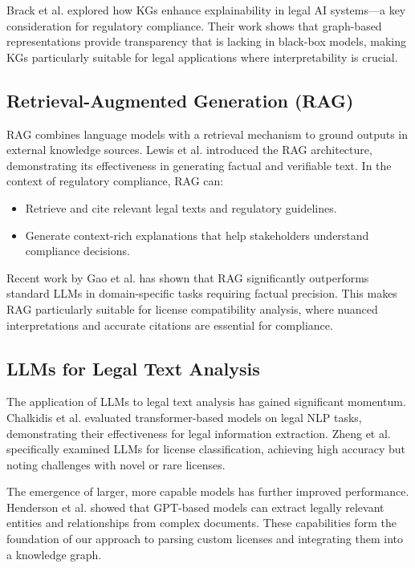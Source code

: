 \documentclass[12pt]{article}
\begin{document}
Brack et al. \cite{brack2021knowledge} explored how KGs enhance explainability in legal AI systems—a key consideration for regulatory compliance. Their work shows that graph-based representations provide transparency that is lacking in black-box models, making KGs particularly suitable for legal applications where interpretability is crucial.

\subsection{Retrieval-Augmented Generation (RAG)}
RAG combines language models with a retrieval mechanism to ground outputs in external knowledge sources. Lewis et al. \cite{lewis2020retrieval} introduced the RAG architecture, demonstrating its effectiveness in generating factual and verifiable text. In the context of regulatory compliance, RAG can:
\begin{itemize}
    \item Retrieve and cite relevant legal texts and regulatory guidelines.
    \item Generate context-rich explanations that help stakeholders understand compliance decisions.
\end{itemize}

Recent work by Gao et al. \cite{gao2023retrieval} has shown that RAG significantly outperforms standard LLMs in domain-specific tasks requiring factual precision. This makes RAG particularly suitable for license compatibility analysis, where nuanced interpretations and accurate citations are essential for compliance.

\subsection{LLMs for Legal Text Analysis}
The application of LLMs to legal text analysis has gained significant momentum. Chalkidis et al. \cite{chalkidis2020legal} evaluated transformer-based models on legal NLP tasks, demonstrating their effectiveness for legal information extraction. Zheng et al. \cite{zheng2021does} specifically examined LLMs for license classification, achieving high accuracy but noting challenges with novel or rare licenses.

The emergence of larger, more capable models has further improved performance. Henderson et al. \cite{henderson2022legal} showed that GPT-based models can extract legally relevant entities and relationships from complex documents. These capabilities form the foundation of our approach to parsing custom licenses and integrating them into a knowledge graph.
\end{document}
